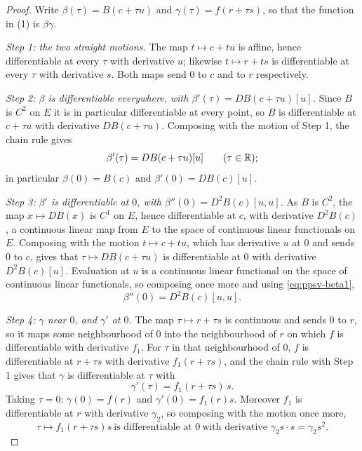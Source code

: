 \begin{proof}
Write $\beta(\tau)=B(c+\tau u)$ and $\gamma(\tau)=f(r+\tau s)$, so that the
function in (1) is $\beta\gamma$.

\emph{Step 1: the two straight motions.} The map $t\mapsto c+tu$ is affine, hence
differentiable at every $\tau$ with derivative $u$; likewise $t\mapsto r+ts$ is
differentiable at every $\tau$ with derivative $s$. Both maps send $0$ to $c$
and to $r$ respectively.

\emph{Step 2: $\beta$ is differentiable everywhere, with
$\beta'(\tau)=DB(c+\tau u)[u]$.} Since $B$ is $C^2$ on $E$ it is in particular
differentiable at every point, so $B$ is differentiable at $c+\tau u$ with
derivative $DB(c+\tau u)$. Composing with the motion of Step 1, the chain rule
gives
\begin{equation}\label{eq:ppsv-beta1}
  \beta'(\tau)=DB(c+\tau u)[u]\qquad(\tau\in\mathbb{R});
\end{equation}
in particular $\beta(0)=B(c)$ and $\beta'(0)=DB(c)[u]$.

\emph{Step 3: $\beta'$ is differentiable at $0$, with
$\beta''(0)=D^2B(c)[u,u]$.} As $B$ is $C^2$, the map $x\mapsto DB(x)$ is $C^1$
on $E$, hence differentiable at $c$, with derivative $D^2B(c)$, a continuous
linear map from $E$ to the space of continuous linear functionals on $E$.
Composing with the motion $t\mapsto c+tu$, which has derivative $u$ at $0$ and
sends $0$ to $c$, gives that $\tau\mapsto DB(c+\tau u)$ is differentiable at $0$
with derivative $D^2B(c)[u]$. Evaluation at $u$ is a continuous linear
functional on the space of continuous linear functionals, so composing once more
and using \eqref{eq:ppsv-beta1},
\begin{equation}\label{eq:ppsv-beta2}
  \beta''(0)=D^2B(c)[u,u].
\end{equation}

\emph{Step 4: $\gamma$ near $0$, and $\gamma'$ at $0$.} The map
$\tau\mapsto r+\tau s$ is continuous and sends $0$ to $r$, so it maps some
neighbourhood of $0$ into the neighbourhood of $r$ on which $f$ is
differentiable with derivative $f_1$. For $\tau$ in that neighbourhood of $0$,
$f$ is differentiable at $r+\tau s$ with derivative $f_1(r+\tau s)$, and the
chain rule with Step 1 gives that $\gamma$ is differentiable at $\tau$ with
\begin{equation}\label{eq:ppsv-gamma1}
  \gamma'(\tau)=f_1(r+\tau s)\,s .
\end{equation}
Taking $\tau=0$: $\gamma(0)=f(r)$ and $\gamma'(0)=f_1(r)s$. Moreover $f_1$ is
differentiable at $r$ with derivative $\gamma_2$, so composing with the motion
once more,
\begin{equation}\label{eq:ppsv-gamma2}
  \tau\mapsto f_1(r+\tau s)s\ \text{is differentiable at }0
  \ \text{with derivative }\gamma_2 s\cdot s=\gamma_2s^2 .
\end{equation}


\end{proof}
